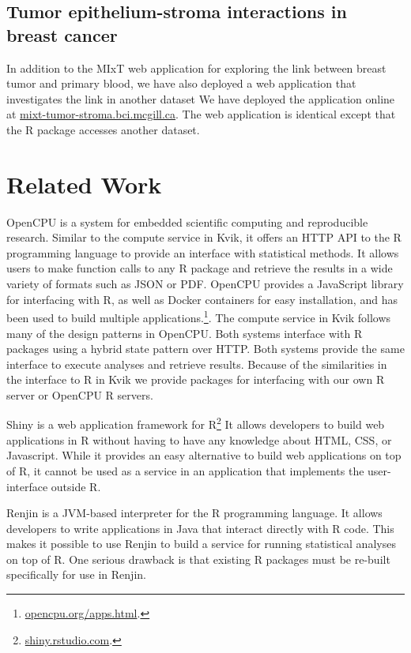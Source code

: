 \subsection{Tumor epithelium-stroma interactions in breast cancer}
In addition to the MIxT web application for exploring the link between breast
tumor and primary blood, we have also deployed a web application that
investigates the link in another dataset\cite{boersma2008stromal} We have
deployed the application online at \url{mixt-tumor-stroma.bci.mcgill.ca}. The
web application is identical except that the R package accesses another dataset. 
    
\section{Related Work} 
OpenCPU is a system for embedded scientific computing and reproducible
research.\cite{opencpu} Similar to the compute service in Kvik, it offers an
HTTP API to the R programming language to provide an interface with statistical
methods. It allows users to make function calls to any R package and retrieve
the results in a wide variety of formats such as JSON or PDF. 
OpenCPU provides a JavaScript library for interfacing with R, as well as Docker
containers for easy installation, and has been used to build multiple
applications.\footnote{\url{opencpu.org/apps.html}.}. The compute service in
Kvik follows many of the design patterns in OpenCPU. Both systems interface with
R packages using a hybrid state pattern over HTTP. Both systems provide the same
interface to execute analyses and retrieve results.  Because of the similarities
in the interface to R in Kvik we provide packages for interfacing with our own R
server or OpenCPU R servers.

Shiny is a web application framework for R\footnote{\url{shiny.rstudio.com}.}
It allows developers to build web applications in R without having to have any
knowledge about HTML, CSS, or Javascript. While it provides an easy alternative
to build web applications on top of R, it cannot be used as a service in an
application that implements the user-interface outside R.  

Renjin is a JVM-based interpreter for the R programming language.\cite{renjin}
It allows developers to write applications in Java that interact directly with R
code. This makes it possible to use Renjin to build a service for running
statistical analyses on top of R. One serious drawback is that existing R
packages must be re-built specifically for use in Renjin. 

